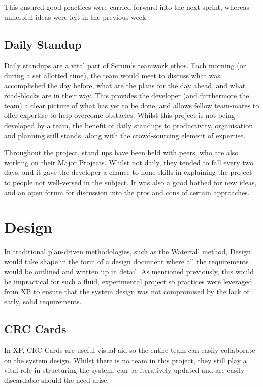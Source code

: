 This ensured good practices were carried forward into the next sprint, whereas unhelpful ideas were left in the previous week.

\subsection{Daily Standup}

Daily standups are a vital part of Scrum`s teamwork ethos. Each morning (or during a set allotted time), the team would meet to discuss what was accomplished the day before, what are the plans for the day ahead, and what road-blocks are in their way. This provides the developer (and furthermore the team) a clear picture of what has yet to be done, and allows fellow team-mates to offer expertise to help overcome obstacles. Whilst this project is not being developed by a team, the benefit of daily standups to productivity, organisation and planning still stands, along with the crowd-sourcing element of expertise.

Throughout the project, stand ups have been held with peers, who are also working on their Major Projects. Whilst not daily, they tended to fall every two days, and it gave the developer a chance to hone skills in explaining the project to people not well-versed in the subject. It was also a good hotbed for new ideas, and an open forum for discussion into the pros and cons of certain approaches.

\newpage
\section{Design}

In traditional plan-driven methodologies, such as the Waterfall method, Design would take shape in the form of a design document where all the requirements would be outlined and written up in detail. As mentioned previously, this would be impractical for such a fluid, experimental project so practices were leveraged from \acrfull{XP} to ensure that the system design was not compromised by the lack of early, solid requirements.

\subsection{CRC Cards}

In \acrshort{XP}, \acrfull{CRC} Cards are useful visual aid so the entire team can easily collaborate on the system design. Whilst there is no team in this project, they still play a vital role in structuring the system, can be iteratively updated and are easily discardable should the need arise.

